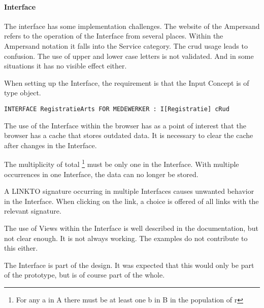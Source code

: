 \paragraph{Interface}
The interface has some implementation challenges.
The website of the Ampersand refers to the operation of the Interface from several places.
Within the Ampersand notation it falls into the Service category.
The \acrlong{crud} usage leads to confusion.
The use of upper and lower case letters is not validated.
And in some situations it has no visible effect either.

When setting up the Interface, the requirement is that the Input Concept is of type object.
\begin{lstlisting}
INTERFACE RegistratieArts FOR MEDEWERKER : I[Registratie] cRud
\end{lstlisting}

The use of the Interface within the browser has as a point of interest that the browser has a cache that stores outdated data.
It is necessary to clear the cache after changes in the Interface.

The multiplicity of total \footnote{For any a in A there must be at least one b in B in the population of r} must be only one in the Interface.
With multiple occurrences in one Interface, the data can no longer be stored.

A LINKTO signature occurring in multiple Interfaces causes unwanted behavior in the Interface.
When clicking on the link, a choice is offered of all links with the relevant signature.

The use of Views within the Interface is well described in the documentation, but not clear enough.
It is not always working.
The examples do not contribute to this either.

The Interface is part of the design.
It was expected that this would only be part of the prototype, but is of course part of the whole.

